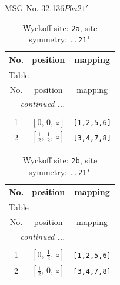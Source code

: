 \documentclass[fleqn,8pt]{jsarticle}
\begin{document}
\setcounter{MaxMatrixCols}{32}

\renewcommand{\tablename}{Table~}
\renewcommand{\figurename}{Figure~}
\begin{center}
\LARGE
MSG No. 32.136\quad$Pba21'$
\end{center}
\renewcommand{\arraystretch}{1.2}
\begin{longtable}{ccc}
\caption{Wyckoff site: {\tt 2a}, site symmetry: {\tt ..21'}}
 \\
 \hline \hline
No. & position & mapping \\ \hline \endfirsthead

\multicolumn{2}{l}{\tablename\ \thetable{}} \\
 \hline \hline
No. & position & mapping \\ \hline \endhead

 \hline \hline
\multicolumn{2}{r}{\footnotesize\it continued ...} \\ \endfoot

 \hline \hline
\multicolumn{2}{r}{} \\ \endlastfoot

1 & $\left[ 0,\, 0,\, z \right]$ & {\tt [1,2,5,6]} \\ \hline
2 & $\left[ \frac{1}{2},\, \frac{1}{2},\, z \right]$ & {\tt [3,4,7,8]} \\
\end{longtable}
\renewcommand{\arraystretch}{1.2}
\begin{longtable}{ccc}
\caption{Wyckoff site: {\tt 2b}, site symmetry: {\tt ..21'}}
 \\
 \hline \hline
No. & position & mapping \\ \hline \endfirsthead

\multicolumn{2}{l}{\tablename\ \thetable{}} \\
 \hline \hline
No. & position & mapping \\ \hline \endhead

 \hline \hline
\multicolumn{2}{r}{\footnotesize\it continued ...} \\ \endfoot

 \hline \hline
\multicolumn{2}{r}{} \\ \endlastfoot

1 & $\left[ 0,\, \frac{1}{2},\, z \right]$ & {\tt [1,2,5,6]} \\ \hline
2 & $\left[ \frac{1}{2},\, 0,\, z \right]$ & {\tt [3,4,7,8]} \\
\end{longtable}
\renewcommand{\arraystretch}{1.2}
\end{document}
